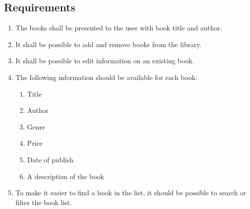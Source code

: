 \documentclass[fleqn,a4paper,11pt]{article}
\begin{document}
\subsection{Requirements}
\begin{enumerate}
\item The books shall be presented to the user with book title and author.
\item It shall be possible to add and remove books from the library.
\item It shall be possible to edit information on an existing book.
\item The following information should be available for each book:
\begin{enumerate}
\item Title
\item Author
\item Genre
\item Price
\item Date of publish
\item A description of the book
\end{enumerate}
\item To make it easier to find a book in the list, it should be possible to search or filter the book list.
\end{enumerate}
\end{document}
